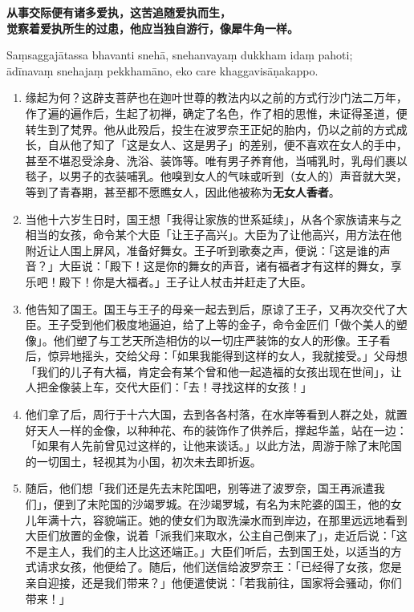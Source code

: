 \textbf{从事交际便有诸多爱执，这苦追随爱执而生，\\}
\textbf{觉察着爱执所生的过患，他应当独自游行，像犀牛角一样。}

Saṃsaggajātassa bhavanti snehā, snehanvayaṃ dukkham idaṃ pahoti;\\
ādīnavaṃ snehajaṃ pekkhamāno, eko care khaggavisāṇakappo. %

\begin{enumerate}\item 缘起为何？这辟支菩萨也在迦叶世尊的教法内以之前的方式行沙门法二万年，作了遍的遍作后，生起了初禅，确定了名色，作了相的思惟，未证得圣道，便转生到了梵界。他从此殁后，投生在波罗奈王正妃的胎内，仍以之前的方式成长，自从他了知了「这是女人、这是男子」的差别，便不喜欢在女人的手中，甚至不堪忍受涂身、洗浴、装饰等。唯有男子养育他，当哺乳时，乳母们裹以毯子，以男子的衣装哺乳。他嗅到女人的气味或听到（女人的）声音就大哭，等到了青春期，甚至都不愿瞧女人，因此他被称为\textbf{无女人香者}。
\item 当他十六岁生日时，国王想「我得让家族的世系延续」，从各个家族请来与之相当的女孩，命令某个大臣「让王子高兴」。大臣为了让他高兴，用方法在他附近让人围上屏风，准备好舞女。王子听到歌奏之声，便说：「这是谁的声音？」大臣说：「殿下！这是你的舞女的声音，诸有福者才有这样的舞女，享乐吧！殿下！你是大福者。」王子让人杖击并赶走了大臣。
\item 他告知了国王。国王与王子的母亲一起去到后，原谅了王子，又再次交代了大臣。王子受到他们极度地逼迫，给了上等的金子，命令金匠们「做个美人的塑像」。他们塑了与工艺天所造相仿的以一切庄严装饰的女人的形像。王子看后，惊异地摇头，交给父母：「如果我能得到这样的女人，我就接受。」父母想「我们的儿子有大福，肯定会有某个曾和他一起造福的女孩出现在世间」，让人把金像装上车，交代大臣们：「去！寻找这样的女孩！」
\item 他们拿了后，周行于十六大国，去到各各村落，在水岸等看到人群之处，就置好天人一样的金像，以种种花、布的装饰作了供养后，撑起华盖，站在一边：「如果有人先前曾见过这样的，让他来谈话。」以此方法，周游于除了末陀国的一切国土，轻视其为小国，初次未去即折返。
\item 随后，他们想「我们还是先去末陀国吧，别等进了波罗奈，国王再派遣我们」，便到了末陀国的沙竭罗城。在沙竭罗城，有名为末陀婆的国王，他的女儿年满十六，容貌端正。她的使女们为取洗澡水而到岸边，在那里远远地看到大臣们放置的金像，说着「派我们来取水，公主自己倒来了」，走近后说：「这不是主人，我们的主人比这还端正。」大臣们听后，去到国王处，以适当的方式请求女孩，他便给了。随后，他们送信给波罗奈王：「已经得了女孩，您是亲自迎接，还是我们带来？」他便遣使说：「若我前往，国家将会骚动，你们带来！」

\end{enumerate}
